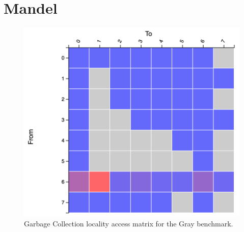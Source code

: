 \documentclass[a4paper,11pt]{article}
\begin{document}
\section{Mandel}

\begin{table}[!htb]
  \centering
  \caption{Garbage Collection frequencies per region and per generation.}
  \label{table:baseline}
\end{table}

\begin{figure}[!htb]
    \centering
    \includegraphics[width=0.6\linewidth]{TechMemo/gc/images/mandel_gc.png}
    \caption{Garbage Collection locality access matrix for the Gray benchmark.}
    \label{fig:my_label}
\end{figure}
\end{document}
